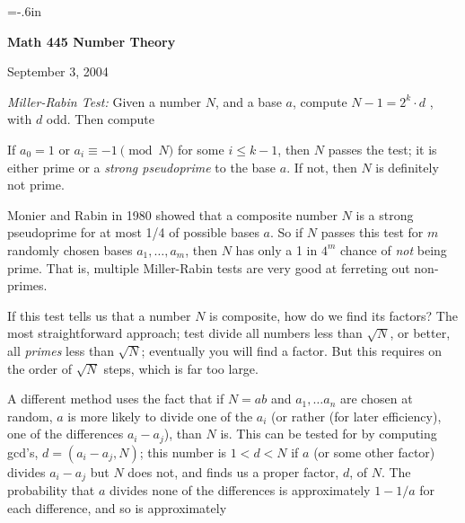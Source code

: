 




\nopagenumbers
\parindent=-20pt
\voffset=-.6in


\def\ctln{\centerline}
\def\u{\underbar}
\def\ssk{\smallskip}
\def\msk{\medskip}
\def\bsk{\bigskip}


\ctln{\bf Math 445 Number Theory}

\medskip

\ctln{September 3, 2004}

\bigskip

{\it Miller-Rabin Test:} Given a number $N$, and a base $a$, compute $N-1 = 2^k\cdot d$ , with $d$ odd. Then compute

\ssk


\ssk

If $a_0=1$ or $a_i\equiv -1\pmod{N}$ for some $i\leq k-1$, then $N$ passes the test; it is either prime or a {\it strong
pseudoprime} to the base $a$. If not, then $N$ is definitely not prime.

\msk

Monier and Rabin in 1980 showed that a composite number $N$ is a strong pseudoprime for at most 1/4 of possible
bases $a$. So if $N$ passes this test for $m$ randomly chosen bases $a_1,\ldots ,a_m$, then $N$ has only a 1 in $4^m$
chance of {\it not} being prime. That is, multiple Miller-Rabin tests are very good at ferreting out non-primes.

\bsk

If this test tells us that a number $N$ is composite, how do we find its factors? The most straightforward 
approach; test divide all numbers less than $\sqrt{N}$, or better, all {\it primes} less than $\sqrt{N}$; 
eventually you will find a factor. But this requires on the order of $\sqrt{N}$ steps, which is far too
large. 

\msk

A different method uses the fact that if $N=ab$ and $a_1,\ldots a_n$ are chosen at random, $a$ is more 
likely to divide one of the $a_i$ (or rather (for later efficiency), one of the differences $a_i-a_j$), than $N$
is. This can be tested for by computing gcd's, $d=(a_i-a_j,N)$; this number is $1<d<N$ if $a$ (or some other
factor) divides $a_i-a_j$ but $N$ does not, and finds us a proper factor, $d$, of $N$. The probability that
$a$ divides none of the differences is approximately $1-1/a$ for each difference, and so is approximately

